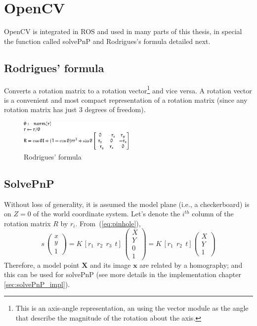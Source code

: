 \section{OpenCV}

OpenCV is integrated in ROS and used in many parts of this thesis, in special the function called solvePnP and Rodrigues's formula detailed next.


\subsection{Rodrigues' formula}

Converts a rotation matrix to a rotation vector\footnote{This is an axis-angle representation, an using the vector module as the angle that describe the magnitude of the rotation about the axis.} and vice versa. A rotation vector is a convenient and most compact representation of a rotation matrix (since any rotation matrix has just 3 degrees of freedom).

\begin{figure}[!htbp]
 \centering
 \includegraphics[width=0.5\textwidth]{images/rodrigues01.png}
 \caption{Rodrigues' formula}
 \label{fig:rodrigues}
\end{figure}




\subsection{SolvePnP}
\label{sec:solvePnP}

Without loss of generality, it is assumed the model plane (i.e., a checkerboard) is on $Z=0$ of the world coordinate system. Let's denote the $i^{th}$ column of the rotation matrix $R$ by $r_i$. From~(\ref{eq:pinhole}),
\begin{equation}
  s\,\begin{pmatrix}
      x \\
      y \\
      1
\end{pmatrix}
= K\, [r_1~~r_2~~r_3~~t]\,\begin{pmatrix}
      X \\
      Y \\
      0 \\
      1
\end{pmatrix}
= K\, [r_1~~r_2~~t]\begin{pmatrix}
      X \\
      Y \\
      1
\end{pmatrix}
\end{equation}
Therefore, a model point $\mathbf{X}$ and its image $\mathbf{x}$ are related by a homography; and this can be used for solvePnP (see more details in the implementation chapter \ref{sec:solvePnP_impl}).

